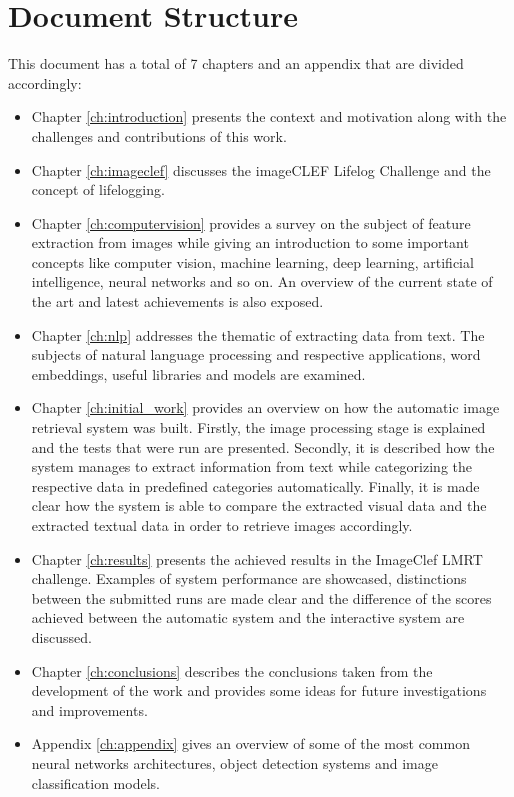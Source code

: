 \section{Document Structure}
This document has a total of 7 chapters and an appendix that are divided accordingly:




\begin{itemize}
  \item Chapter \ref{ch:introduction} presents the context and motivation along with the challenges and contributions of this work.
  \item Chapter \ref{ch:imageclef} discusses the imageCLEF Lifelog Challenge and the concept of lifelogging.
  \item Chapter \ref{ch:computervision} provides a survey on the subject of feature extraction from images while giving an introduction to some important concepts like computer vision, machine learning, deep learning, artificial intelligence, neural networks and so on. An overview of the current state of the art and latest achievements is also exposed.
  
  \item Chapter \ref{ch:nlp} addresses the thematic of extracting data from text. The subjects of natural language processing and respective applications, word embeddings, useful libraries and models are examined.  
  
  
  \item Chapter \ref{ch:initial_work} provides an overview on how the automatic image retrieval system was built. Firstly, the image processing stage is explained and the tests that were run are presented. Secondly, it is described how the system manages to extract information from text while categorizing the respective data in predefined categories automatically. Finally, it is made clear how the system is able to compare the extracted visual data and the extracted textual data in order to retrieve images accordingly.
  


  \item Chapter \ref{ch:results} presents the achieved results in the ImageClef LMRT challenge. Examples of system performance are showcased, distinctions between the submitted runs are made clear and the difference of the scores achieved between the automatic system and the interactive system are discussed.
  
  \item Chapter \ref{ch:conclusions} describes the conclusions taken from the development of the work and provides some ideas for future investigations and improvements.
  
  \item Appendix \ref{ch:appendix} gives an overview of some of the most common neural networks architectures, object detection systems and image classification models.
 
 
\end{itemize}

